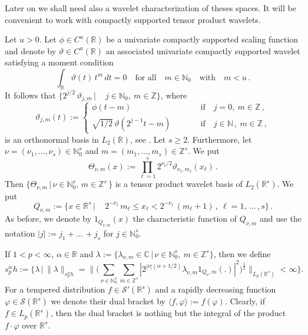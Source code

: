 \documentclass[12pt]{article}
\newcommand{\NN}{\mathbb{N}}
\newcommand{\ZZ}{\mathbb{Z}}
\newcommand{\real}{\mathbb{R}}
\newcommand{\re}{\mathbb{R}}
\newcommand{\N}{\mathbb{N}}
\newcommand{\zz}{\mathbb{Z}}
\begin{document}

Later on we shall need also a wavelet characterization of theses spaces.
It will be convenient to work with compactly supported tensor product wavelets.

Let $u >0$.
Let $\phi \in C^u (\real)$ be a univariate compactly supported scaling function
and denote by   $\vartheta \in C^u (\real)$ an associated univariate compactly supported 
wavelet satisfying a moment condition 
\[
 \int_{\real} \vartheta  (t)\, t^m \, dt =0 \quad \mbox{for all}\quad m \in \NN_0 
\quad \mbox{with} \quad m< u\, .
\]
It follows that
$\{ 2^{j/2}\, \vartheta_{j,m} \,|\, \quad j \in \NN_0, \: m \in \ZZ\}$, where
\[
\vartheta_{j,m} (t):= \left\{ \begin{array}{lll}
	\phi (t-m) & \qquad & \mbox{if}\quad j=0, \: m \in \zz\, , 
	\\
	\sqrt{1/2} \, \vartheta (2^{j-1}t-m)& \qquad & \mbox{if}\quad j\in \N\, , \: m \in \zz\, , 
\end{array} \right.
\]
is an orthonormal basis in $L_2 (\re)$, see \cite{Woj}. Let $s\ge 2$.
Furthermore, let ${\nu} =(\nu_1, \ldots ,\nu_s) \in \mathbb{N}_0^s$ and ${m}= (m_1, \ldots , m_s)\in \mathbb{Z}^s$.
We put
\[
\Theta_{{\nu}, m} (x) := \prod_{\ell=1}^{s} 2^{\nu_\ell/2} \vartheta_{\nu_\ell, m_\ell} (x_\ell)\, . 
\]
Then $\{ \Theta_{{\nu}, {m}} \,|\, {\nu} \in \NN_0^s, \, {m} \in \ZZ^s\, 
\}$
is a tensor product wavelet basis of $L_2 (\real^s)$.
We 
put
\[
Q_{{\nu},{m}} := \Big\{x\in \real^s \, \Big|\,  \quad 2^{-\nu_\ell} \, m_\ell \le  x_\ell < 2^{-\nu_\ell}\, (m_\ell+1)\, , \: \ell = 1, \, \ldots \, , s\Big\} \, .
\]
As before, we denote by $1_{Q_{{\nu},{m}}}(x)$ the characteristic function of $Q_{{\nu},{m}}$ and use the notation $|j| := j_1 + \ldots \, + j_s $ for $j \in \NN_0^s$.

If $1<p < \infty$, $ \alpha \in \mathbb{R}$ and
	$\lambda:=\lbrace \lambda_{{\nu},{m}}\in\mathbb{C} \,|\, {\nu}\in \mathbb{N}_0^s,\ {m}\in \mathbb{Z}^s \rbrace$,
	then we define
\begin{equation}\label{def:s_alpha_p_h}
	s_{p}^\alpha h := \Big\lbrace\lambda \,\Big|\, \| \lambda \|_{s_{p}^\alpha h} =
	\Big\|\Big(\sum_{{\nu}\in \mathbb{N}_0^s}\sum_{{m}\in \mathbb{Z}^s}|2^{|{\nu}| (\alpha + 1/2)} 	\lambda_{{\nu},{m}} 1_{Q_{\nu},{m}}(.) 
	|^2\Big)^{\frac{1}{2}}\Big\|_{ L_p(\mathbb{R}^s)} <\infty \Big\rbrace. 
\end{equation}
For a tempered distribution $f\in \mathcal{S}'(\real^s)$ and a rapidly decreasing function $\varphi \in \mathcal{S}(\real^s)$ we denote their dual bracket by $\langle f, \varphi \rangle := f(\varphi)$. Clearly, if $f\in L_p(\real^s)$, then the dual bracket is nothing but the integral of the product $f \cdot \varphi$ over $\real^s$.
\end{document}
